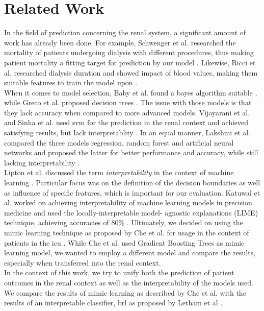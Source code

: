 \documentclass[conference,comsoc]{IEEEtran}
\begin{document}
\section{Related Work}
\label{sec:related}
In the field of prediction concerning the renal system, a significant amount of work has already been done.
For example, Schwenger et al. researched the mortality of patients undergoing dialysis with different procedures, thus making patient mortality a fitting target for prediction by our model \cite{Schwenger2012}.
Likewise, Ricci et al. researched dialysis duration and showed impact of blood values, making them suitable features to train the model upon \cite{Ricci2006}. \\
When it comes to model selection, Baby et al. found a bayes algorithm suitable \cite{Baby2015}, while Greco et al. proposed decision trees \cite{Greco2010}.
The issue with those models is that they lack accuracy when compared to more advanced models.
Vijayarani et al. and Sinha et al. used \gls{svm} for the prediction in the renal context and achieved satisfying results, but lack interpretablity \cite{Vijayarani2015} \cite{Sinha2015}.
In an equal manner, Lakshmi et al. compared the three models regression, random forest and artificial neural networks and proposed the latter for better performance and accuracy, while still lacking interpretability \cite{Lakshmi2014}. \\
Lipton et al. discussed the term \emph{interpretability} in the context of machine learning \cite{Lipton2016}. 
Particular focus was on the definition of the decision boundaries as well as influence of specific features, which is important for our evaluation.
Katuwal et al. worked on achieving interpretability of machine learning models in precision medicine and used the locally-interpretable model- agnostic explanations (LIME) technique, achieving accuracies of 80\% \cite{Katuwal2016}.
Ultimately, we decided on using the mimic learning technique as proposed by Che et al. for usage in the context of patients in the \gls{icu} \cite{Che2016}.
While Che et al. used Gradient Boosting Trees as mimic learning model, we wanted to employ a different model and compare the results, especially when transferred into the renal context. \\
In the context of this work, we try to unify both the prediction of patient outcomes in the renal context as well as the interpretability of the models used.
We compare the results of mimic learning as described by Che et al. with the results of an interpretable classifier, \gls{brl} as proposed by Letham et al \cite{Che2016} \cite{Letham2015}.
\end{document}
